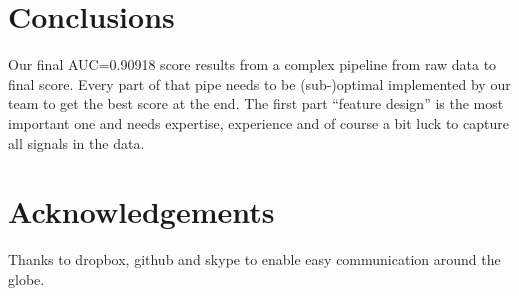 \section{Conclusions}
Our final AUC=0.90918 score results from a complex pipeline from raw data to final score.
Every part of that pipe needs to be (sub-)optimal implemented by our team to get the best score at the end.
The first part ``feature design'' is the most important one and needs expertise, experience and of course a bit luck to capture all signals in the data.

\section{Acknowledgements}
Thanks to dropbox, github and skype to enable easy communication around the globe.
